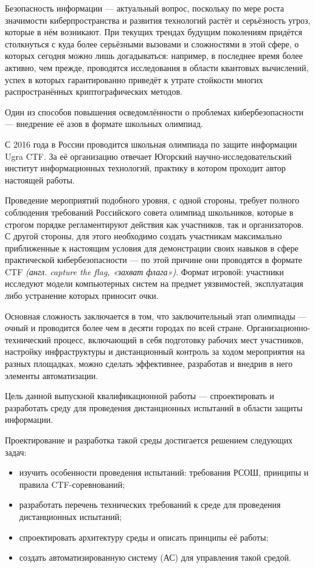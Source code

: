 \Introduction
Безопасность информации — актуальный вопрос, поскольку по мере роста значимости киберпространства и развития технологий растёт и серьёзность угроз, которые в нём возникают. При текущих трендах будущим поколениям придётся столкнуться с куда более серьёзными вызовами и сложностями в этой сфере, о которых сегодня можно лишь догадываться: например, в последнее время более активно, чем прежде, проводятся исследования в области квантовых вычислений\cite{Quantum1}\cite{Quantum2}, успех в которых гарантированно приведёт к утрате стойкости многих распространённых криптографических методов\cite{Quantum3}.

Один из способов повышения осведомлённости о проблемах кибербезопасности — внедрение её азов в формате школьных олимпиад.

С 2016 года в России проводится школьная олимпиада по защите информации Ugra CTF\cite{UgraCTF}. За её организацию отвечает Югорский научно-исследовательский институт информационных технологий, практику в котором проходит автор настоящей работы.

Проведение мероприятий подобного уровня, с одной стороны, требует полного соблюдения требований Российского совета олимпиад школьников\cite{Rosolymp}, которые в строгом порядке регламентируют действия как участников, так и организаторов. С другой стороны, для этого необходимо создать участникам максимально приближенные к настоящим условия для демонстрации своих навыков в сфере практической кибербезопасности — по этой причине они проводятся в формате CTF \textit{(англ. capture the flag, «захват флага»)}. Формат игровой: участники исследуют модели компьютерных систем на предмет уязвимостей, эксплуатация либо устранение которых приносит очки.

Основная сложность заключается в том, что заключительный этап олимпиады --- очный и проводится более чем в десяти городах по всей стране. Организационно-технический процесс, включающий в себя подготовку рабочих мест участников, настройку инфраструктуры и дистанционный контроль за ходом мероприятия на разных площадках, можно сделать эффективнее, разработав и внедрив в него элементы автоматизации.

Цель данной выпускной квалификационной работы --- спроектировать и разработать среду для проведения дистанционных испытаний в области защиты информации.

Проектирование и разработка такой среды достигается решением следующих задач:
\begin{itemize}
\item изучить особенности проведения испытаний: требования РСОШ, принципы и правила CTF-соревнований;
\item разработать перечень технических требований к среде для проведения дистанционных испытаний;
\item спроектировать архитектуру среды и описать принципы её работы;
\item создать автоматизированную систему (АС) для управления такой средой.
\end{itemize}

